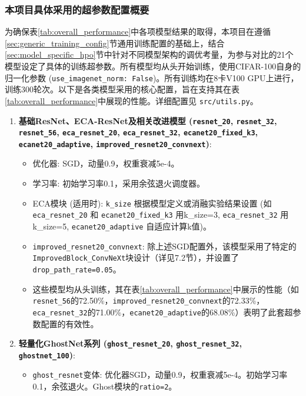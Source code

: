 \documentclass[a4paper]{article}
\begin{document}
\begin{description}
\subsubsection{本项目具体采用的超参数配置概要}
为确保表\ref{tab:overall_performance}中各项模型结果的取得，本项目在遵循\ref{sec:generic_training_config}节通用训练配置的基础上，结合\ref{sec:model_specific_hpo}节中针对不同模型架构的调优考量，为参与对比的21个模型设定了具体的训练超参数。所有模型均从头开始训练，使用CIFAR-100自身的归一化参数 (\texttt{use\_imagenet\_norm: False})。所有训练均在8卡V100 GPU上进行，训练300轮次。以下是各类模型采用的核心配置，旨在支持其在表\ref{tab:overall_performance}中展现的性能。详细配置见 \texttt{src/utils.py}。

\begin{enumerate}
    \item \textbf{基础ResNet、ECA-ResNet及相关改进模型 (\texttt{resnet\_20}, \texttt{resnet\_32}, \texttt{resnet\_56}, \texttt{eca\_resnet\_20}, \texttt{eca\_resnet\_32}, \texttt{ecanet20\_fixed\_k3}, \texttt{ecanet20\_adaptive}, \texttt{improved\_resnet20\_convnext})}:
    \begin{itemize}
        \item 优化器: SGD，动量0.9，权重衰减5e-4。
        \item 学习率: 初始学习率0.1，采用余弦退火调度器。
        \item ECA模块 (适用时): \texttt{k\_size} 根据模型定义或消融实验结果设置 (如 \texttt{eca\_resnet\_20} 和 \texttt{ecanet20\_fixed\_k3} 用k\_size=3, \texttt{eca\_resnet\_32} 用k\_size=5, \texttt{ecanet20\_adaptive} 自适应计算k值)。
        \item \texttt{improved\_resnet20\_convnext}: 除上述SGD配置外，该模型采用了特定的\texttt{ImprovedBlock\_ConvNeXt}块设计（详见7.2节），并设置了\texttt{drop\_path\_rate=0.05}。
        \item 这些模型均从头训练，其在表\ref{tab:overall_performance}中展示的性能（如\texttt{resnet\_56}的72.50\%，\texttt{improved\_resnet20\_convnext}的72.33\%，\texttt{eca\_resnet\_32}的71.00\%，\texttt{ecanet20\_adaptive}的68.08\%）表明了此套超参数配置的有效性。
    \end{itemize}
    \item \textbf{轻量化GhostNet系列 (\texttt{ghost\_resnet\_20}, \texttt{ghost\_resnet\_32}, \texttt{ghostnet\_100})}:
    \begin{itemize}
        \item \texttt{ghost\_resnet}变体: 优化器SGD，动量0.9，权重衰减5e-4。初始学习率0.1，余弦退火。Ghost模块的\texttt{ratio=2}。

\end{itemize}
\end{enumerate}
\end{description}
\end{document}
